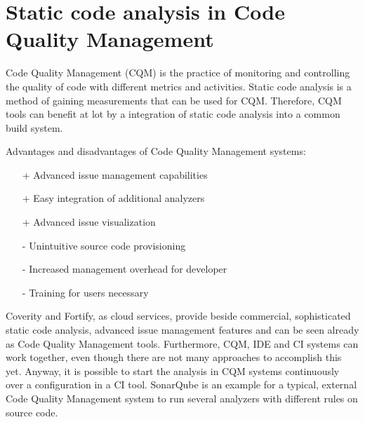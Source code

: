 \documentclass[conference]{IEEEtran}
\begin{document}
\section{Static code analysis in Code Quality Management}
\label{sec:static_code_analysis_code_quality_management}

Code Quality Management (CQM) is the practice of monitoring and controlling the quality of code with different metrics and activities.
Static code analysis is a method of gaining measurements that can be used for CQM. Therefore, CQM tools can benefit at lot by a integration of static code analysis into a common build system.


Advantages and disadvantages of Code Quality Management systems:
\begin{itemize}
	\item[+] Advanced issue management capabilities
	\item[+] Easy integration of additional analyzers
	\item[+] Advanced issue visualization
	\item[-] Unintuitive source code provisioning
	\item[-] Increased management overhead for developer
	\item[-] Training for users necessary 
\end{itemize}

Coverity and Fortify, as cloud services, provide beside commercial, sophisticated static code analysis, advanced issue management features and can be seen already as Code Quality Management tools.
Furthermore, CQM, IDE and CI systems can work together, even though there are not many approaches to accomplish this yet. 
Anyway, it is possible to start the analysis in CQM systems continuously over a configuration in a CI tool.
SonarQube is an example for a typical, external Code Quality Management system to run several analyzers with different rules on source code.
\end{document}
